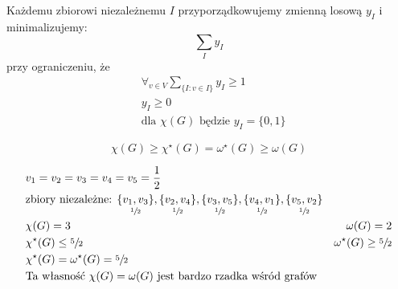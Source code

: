 \begin{definition}
Każdemu zbiorowi niezależnemu $I$ przyporządkowujemy zmienną losową $y_I$ i minimalizujemy: $$\sum _I y_I$$ przy ograniczeniu, że 
\begin{align*}
&\forall _{v\in V} \sum _{\{I:v\in I\}}y_I\geq 1\\
&y_I\geq 0\\
&\text{dla }\chi (G) \text{ będzie } y_I=\{0,1\}
\end{align*}
\end{definition}

\begin{fact}
$$\chi (G)\geq \chi ^\star(G)=\omega ^\star(G)\geq \omega (G)$$
\end{fact}

\begin{figure}[H]
\centering
{}
\end{figure}
\begin{align*}
&v_1=v_2=v_3=v_4=v_5=\frac{1}{2}\\
&\text{zbiory niezależne: } 
\underset{\sfrac{1}{2}}{\{v_1,v_3\}}, \underset{\sfrac{1}{2}}{\{v_2,v_4\}},
\underset{\sfrac{1}{2}}{\{v_3,v_5\}}, \underset{\sfrac{1}{2}}{\{v_4,v_1\}},
\underset{\sfrac{1}{2}}{\{v_5,v_2\}}\\
&\chi (G)=3 & \omega (G) = 2\\
&\chi ^\star(G)\leq \sfrac{5}{2} & \omega ^\star(G)\geq \sfrac{5}{2}\\
&\chi ^\star(G) = \omega ^\star(G)= \sfrac{5}{2}\\
&\text{Ta własność } \chi (G)=\omega (G) \text{ jest bardzo rzadka wśród grafów}
\end{align*}





